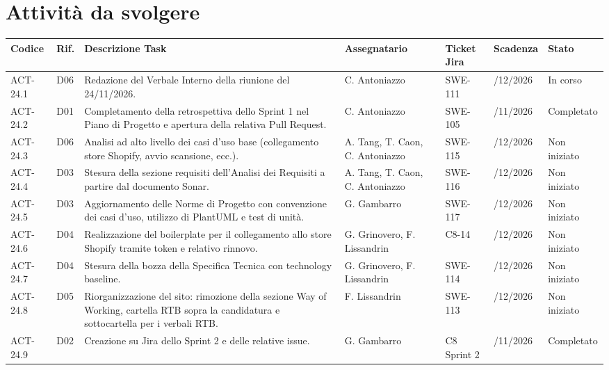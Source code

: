 \newpage

\section{Attività da svolgere}

\renewcommand{\arraystretch}{1.3}
\noindent
{\small\setlength{\tabcolsep}{3pt}%
\begin{tabularx}{\textwidth}{|>{\raggedright\arraybackslash}p{1.65cm}|>{\raggedright\arraybackslash}p{0.75cm}|>{\raggedright\arraybackslash}X|>{\raggedright\arraybackslash}p{2.3cm}|>{\raggedright\arraybackslash}p{1.45cm}|>{\raggedright\arraybackslash}p{1.8cm}|>{\raggedright\arraybackslash}p{1.85cm}|}
    \hline
    \textbf{Codice} & \textbf{Rif.} & \textbf{Descrizione Task} & \textbf{Assegnatario} & \textbf{Ticket Jira} & \textbf{Scadenza} & \textbf{Stato} \\
    \hline
    ACT-24.1 & D06 & Redazione del Verbale Interno della riunione del 24/11/2026. & C. Antoniazzo & SWE-111 & 01/12/2026 & In corso \\
    \hline
    ACT-24.2 & D01 & Completamento della retrospettiva dello Sprint 1 nel Piano di Progetto e apertura della relativa Pull Request. & C. Antoniazzo & SWE-105 & 25/11/2026 & Completato \\
    \hline
    ACT-24.3 & D06 & Analisi ad alto livello dei casi d'uso base (collegamento store Shopify, avvio scansione, ecc.). & A. Tang, T. Caon, C. Antoniazzo & SWE-115 & 01/12/2026 & Non iniziato \\
    \hline
    ACT-24.4 & D03 & Stesura della sezione requisiti dell'Analisi dei Requisiti a partire dal documento Sonar. & A. Tang, T. Caon, C. Antoniazzo & SWE-116 & 08/12/2026 & Non iniziato \\
    \hline
    ACT-24.5 & D03 & Aggiornamento delle Norme di Progetto con convenzione dei casi d'uso, utilizzo di PlantUML e test di unità. & G. Gambarro & SWE-117 & 08/12/2026 & Non iniziato \\
    \hline
    ACT-24.6 & D04 & Realizzazione del boilerplate per il collegamento allo store Shopify tramite token e relativo rinnovo. & G. Grinovero, F. Lissandrin & C8-14 & 08/12/2026 & Non iniziato \\
    \hline
    ACT-24.7 & D04 & Stesura della bozza della Specifica Tecnica con technology baseline. & G. Grinovero, F. Lissandrin & SWE-114 & 08/12/2026 & Non iniziato \\
    \hline
    ACT-24.8 & D05 & Riorganizzazione del sito: rimozione della sezione Way of Working, cartella RTB sopra la candidatura e sottocartella per i verbali RTB. & F. Lissandrin & SWE-113 & 08/12/2026 & Non iniziato \\
    \hline
    ACT-24.9 & D02 & Creazione su Jira dello Sprint 2 e delle relative issue. & G. Gambarro & C8 Sprint 2 & 25/11/2026 & Completato \\
    \hline
\end{tabularx}}
